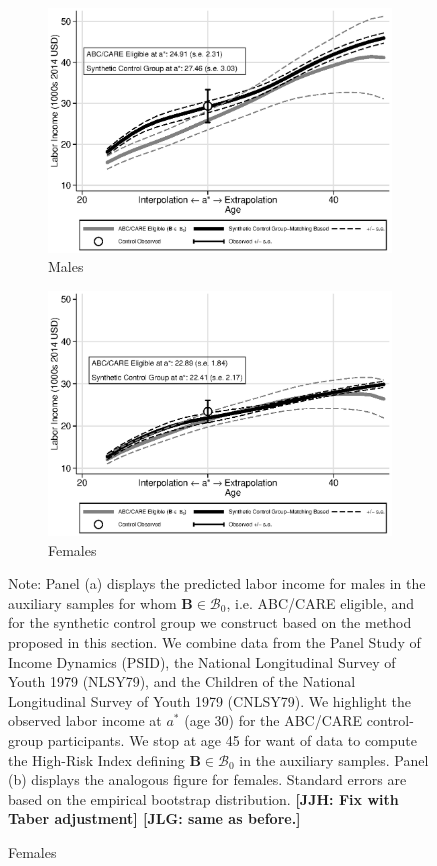 \begin{figure}
\centering
\caption{Labor Income Profile, Disadvantaged Individuals Synthetic Control Group in the Auxiliary Samples}\label{figure:controltests}
\begin{subfigure}[h]{0.5\textwidth}
		\centering
		\caption{Males}
		\includegraphics[width=\textwidth]{output/abccare_disad_1.eps}
\end{subfigure}%
\begin{subfigure}[h]{0.5\textwidth}
		\centering
		\caption{Females}
		\includegraphics[width=\textwidth]{output/abccare_disad_0.eps}
\end{subfigure}
\footnotesize \justify
Note: Panel (a) displays the predicted labor income for males in the auxiliary samples for whom $\bm{B} \in \mathcal{B}_0$, i.e. ABC/CARE eligible, and for the synthetic control group we construct based on the method proposed in this section. We combine data from the Panel Study of Income Dynamics (PSID), the National Longitudinal Survey of Youth 1979 (NLSY79), and the Children of the National Longitudinal Survey of Youth 1979 (CNLSY79). We highlight the observed labor income at $a^*$ (age 30) for the ABC/CARE control-group participants. We stop at age 45 for want of data to compute the High-Risk Index defining $\bm{B} \in \mathcal{B}_0$ in the auxiliary samples. Panel (b) displays the analogous figure for females. Standard errors are based on the empirical bootstrap distribution.  \textbf{[JJH: Fix with Taber adjustment] [JLG: same as before.]}

\end{figure}

